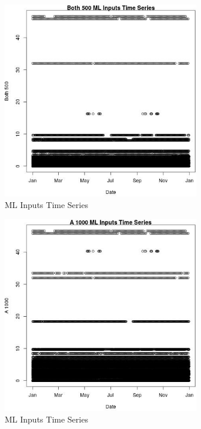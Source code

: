 \begin{figure} 
\centering  
\includegraphics[width=0.77\textwidth]{Code_Outputs/Report_ML_input_PM25_Step4_part_e_de_duplicated_aves_Both_500vDate.jpg} 
\caption{\label{fig:Report_ML_input_PM25_Step4_part_e_de_duplicated_avesBoth_500vDate}ML Inputs Time Series} 
\end{figure} 
 

\begin{figure} 
\centering  
\includegraphics[width=0.77\textwidth]{Code_Outputs/Report_ML_input_PM25_Step4_part_e_de_duplicated_aves_A_1000vDate.jpg} 
\caption{\label{fig:Report_ML_input_PM25_Step4_part_e_de_duplicated_avesA_1000vDate}ML Inputs Time Series} 
\end{figure} 
 

